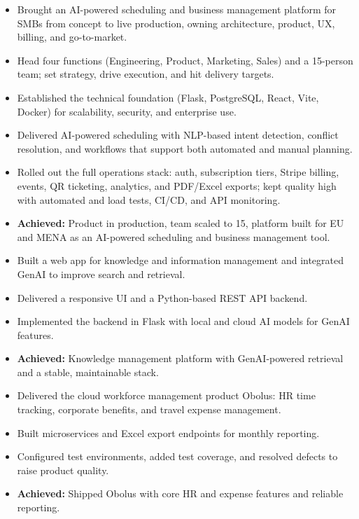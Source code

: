 \documentclass[10pt,a4paper]{altacv}
\begin{document}
\begin{itemize}
    \item Brought an AI-powered scheduling and business management platform for SMBs from concept to live production, owning architecture, product, UX, billing, and go-to-market.
    \item Head four functions (Engineering, Product, Marketing, Sales) and a 15-person team; set strategy, drive execution, and hit delivery targets.
    \item Established the technical foundation (Flask, PostgreSQL, React, Vite, Docker) for scalability, security, and enterprise use.
    \item Delivered AI-powered scheduling with NLP-based intent detection, conflict resolution, and workflows that support both automated and manual planning.
    \item Rolled out the full operations stack: auth, subscription tiers, Stripe billing, events, QR ticketing, analytics, and PDF/Excel exports; kept quality high with automated and load tests, CI/CD, and API monitoring.
    \item \textbf{Achieved:} Product in production, team scaled to 15, platform built for EU and MENA as an AI-powered scheduling and business management tool.
\end{itemize}

\divider
{}
\begin{itemize}
    \item Built a web app for knowledge and information management and integrated GenAI to improve search and retrieval.
    \item Delivered a responsive UI and a Python-based REST API backend.
    \item Implemented the backend in Flask with local and cloud AI models for GenAI features.
    \item \textbf{Achieved:} Knowledge management platform with GenAI-powered retrieval and a stable, maintainable stack.
\end{itemize}

\divider
{}
\begin{itemize}
    \item Delivered the cloud workforce management product Obolus: HR time tracking, corporate benefits, and travel expense management.
    \item Built microservices and Excel export endpoints for monthly reporting.
    \item Configured test environments, added test coverage, and resolved defects to raise product quality.
    \item \textbf{Achieved:} Shipped Obolus with core HR and expense features and reliable reporting.
\end{itemize}
\end{document}
